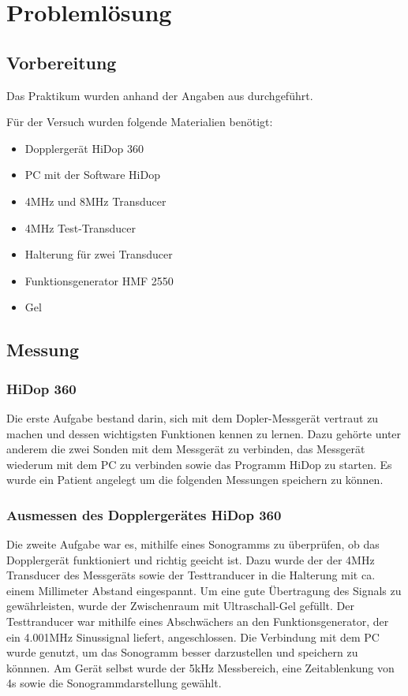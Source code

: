 \documentclass[11pt]{scrartcl}
\begin{document}
    \section{Problemlösung}
    \subsection{Vorbereitung}
   Das Praktikum wurden anhand der Angaben aus \cite{Doppler} durchgeführt.
    
    Für der Versuch wurden folgende Materialien benötigt:
    \begin{itemize}
        \item Dopplergerät HiDop 360 
        \item PC mit der Software HiDop
        \item 4MHz und 8MHz Transducer
        \item 4MHz Test-Transducer 
        \item Halterung für zwei Transducer
        \item Funktionsgenerator HMF 2550 
        \item Gel
    \end{itemize}


    \subsection{Messung}
    \subsubsection{HiDop 360}
    Die erste Aufgabe bestand darin, sich mit dem Dopler-Messgerät vertraut zu machen 
    und dessen wichtigsten Funktionen kennen zu lernen.
    Dazu gehörte unter anderem die zwei Sonden mit dem Messgerät zu verbinden, das Messgerät
    wiederum mit dem PC zu verbinden sowie das Programm HiDop zu starten.
    Es wurde ein Patient angelegt um die folgenden Messungen speichern zu können.

    \subsubsection{Ausmessen des Dopplergerätes HiDop 360}
    Die zweite Aufgabe war es, mithilfe eines Sonogramms zu überprüfen, ob das Dopplergerät funktioniert und richtig geeicht ist. 
    Dazu wurde der der 4MHz Transducer des Messgeräts sowie der Testtranducer in die Halterung mit ca. einem Millimeter Abstand eingespannt.
    Um eine gute Übertragung des Signals zu gewährleisten, wurde der Zwischenraum mit Ultraschall-Gel gefüllt.
    Der Testtranducer war mithilfe eines Abschwächers an den Funktionsgenerator, der ein 4.001MHz Sinussignal liefert, angeschlossen. 
    Die Verbindung mit dem PC wurde genutzt, um das Sonogramm besser darzustellen und speichern zu könnnen.
    Am Gerät selbst wurde der 5kHz Messbereich, eine Zeitablenkung von 4s sowie die Sonogrammdarstellung gewählt.
\end{document}

